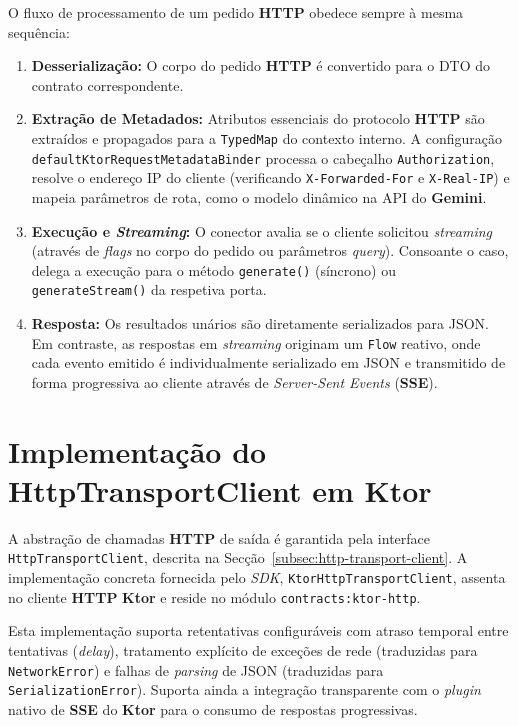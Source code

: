     O fluxo de processamento de um pedido \textbf{HTTP} obedece sempre à mesma sequência:
    \begin{enumerate}
        \item \textbf{Desserialização:} O corpo do pedido \textbf{HTTP} é convertido para o DTO do contrato correspondente.
        \item \textbf{Extração de Metadados:} Atributos essenciais do protocolo \textbf{HTTP} são extraídos e propagados para a \texttt{TypedMap} do contexto interno. A configuração \texttt{default\allowbreak Ktor\allowbreak Request\allowbreak Metadata\allowbreak Binder} processa o cabeçalho \texttt{Authorization}, resolve o endereço IP do cliente (verificando \texttt{X-Forwarded-For} e \texttt{X-Real-IP}) e mapeia parâmetros de rota, como o modelo dinâmico na API do \textbf{Gemini}.
        \item \textbf{Execução e \textit{Streaming}:} O conector avalia se o cliente solicitou \textit{streaming} (através de \textit{flags} no corpo do pedido ou parâmetros \textit{query}). Consoante o caso, delega a execução para o método \texttt{generate()} (síncrono) ou \texttt{generateStream()} da respetiva porta.
       \item \textbf{Resposta:} Os resultados unários são diretamente serializados para JSON. Em contraste, as respostas em \textit{streaming} originam um \texttt{Flow} reativo, onde cada evento emitido é individualmente serializado em JSON e transmitido de forma progressiva ao cliente através de \textit{Server-Sent Events} (\textbf{SSE}).
    \end{enumerate}

    \section{Implementação do HttpTransportClient em Ktor}
    \label{sec:ktor-transport-impl}

    A abstração de chamadas \textbf{HTTP} de saída é garantida pela interface \texttt{HttpTransportClient}, descrita na Secção~\ref{subsec:http-transport-client}. A implementação concreta fornecida pelo \textit{SDK}, \texttt{KtorHttpTransportClient}, assenta no cliente \textbf{HTTP} \textbf{Ktor} e reside no módulo \texttt{contracts:ktor-http}. 
    
    Esta implementação suporta retentativas configuráveis com atraso temporal entre tentativas (\textit{delay}), tratamento explícito de exceções de rede (traduzidas para \texttt{NetworkError}) e falhas de \textit{parsing} de JSON (traduzidas para \texttt{SerializationError}). Suporta ainda a integração transparente com o \textit{plugin} nativo de \textbf{SSE} do \textbf{Ktor} para o consumo de respostas progressivas.

